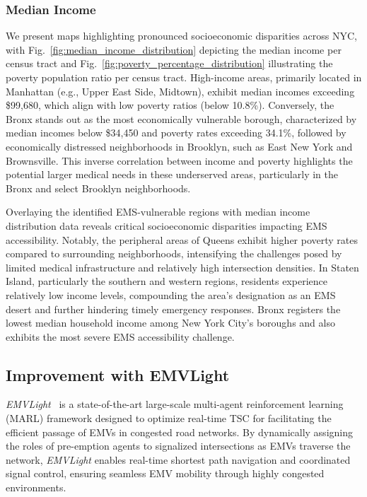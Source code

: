 \subsubsection{Median Income}
We present maps highlighting pronounced socioeconomic disparities across NYC, with Fig.~\ref{fig:median_income_distribution} depicting the median income per census tract and Fig.~\ref{fig:poverty_percentage_distribution} illustrating the poverty population ratio per census tract. High-income areas, primarily located in Manhattan (e.g., Upper East Side, Midtown), exhibit median incomes exceeding \$99,680, which align with low poverty ratios (below 10.8\%). Conversely, the Bronx stands out as the most economically vulnerable borough, characterized by median incomes below \$34,450 and poverty rates exceeding 34.1\%, followed by economically distressed neighborhoods in Brooklyn, such as East New York and Brownsville. This inverse correlation between income and poverty highlights the potential larger medical needs in these underserved areas, particularly in the Bronx and select Brooklyn neighborhoods.

Overlaying the identified EMS-vulnerable regions with median income distribution data reveals critical socioeconomic disparities impacting EMS accessibility. Notably, the peripheral areas of Queens exhibit higher poverty rates compared to surrounding neighborhoods, intensifying the challenges posed by limited medical infrastructure and relatively high intersection densities. In Staten Island, particularly the southern and western regions, residents experience relatively low income levels, compounding the area's designation as an EMS desert and further hindering timely emergency responses. Bronx registers the lowest median household income among New York City's boroughs and also exhibits the most severe EMS accessibility challenge.

\subsection{Improvement with EMVLight}\label{subsec:improvement}
\textit{EMVLight}~\cite{su2023emvlight} is a state-of-the-art large-scale multi-agent reinforcement learning (MARL) framework designed to optimize real-time TSC for facilitating the efficient passage of EMVs in congested road networks. By dynamically assigning the roles of pre-emption agents to signalized intersections as EMVs traverse the network, \textit{EMVLight} enables real-time shortest path navigation and coordinated signal control, ensuring seamless EMV mobility through highly congested environments.

